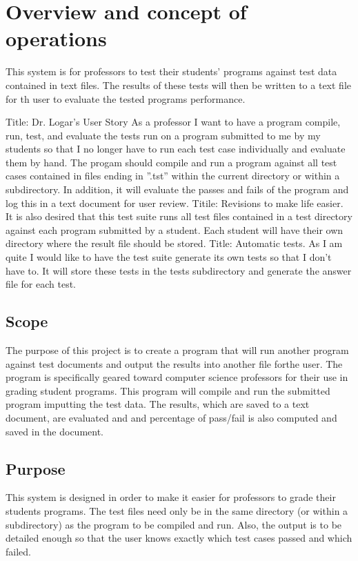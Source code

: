 
\chapter{Overview and concept of operations}

This system is for professors to test their students’ programs against test data contained in text files. The results of these tests will then be written to a text file for th user to evaluate the tested programs performance.

Title: Dr. Logar’s User Story As a professor I want to have a program compile, run, test, and evaluate the tests run on a program submitted to me by my students so that I no longer have to run each test case individually and evaluate them by hand.
The progam should compile and run a program against all test cases contained in files ending in ”.tst” within the current directory or within a subdirectory. In addition, it will evaluate the passes and fails of the program and log this in a text document for user review.
Titile: Revisions to make life  easier. It is also desired that this test suite runs all test files contained in a test directory against each program submitted by a student. Each student will have their own directory where the result file should be stored. 
Title: Automatic tests. As I am quite I would like to have the test suite generate its own tests so that I don't have to. It will store these tests in the tests subdirectory and generate the answer file for each test. 





\section{Scope}
The purpose of this project is to create a program that will run another program against test documents and output the 
results into another file forthe user. The program is specifically geared toward computer science professors for their use in 
grading student programs. This program will compile and run the submitted program imputting the test data. The results, which are saved to a text document, are evaluated and and percentage of pass/fail is also computed and saved in the
document.


\section{Purpose}
This system is designed in order to make it easier for professors to grade their students programs. The test files need only be 
in the same directory (or within a subdirectory) as the program to be compiled and run. Also, the output is to be detailed 
enough so that the user knows exactly which test cases passed and which failed.


